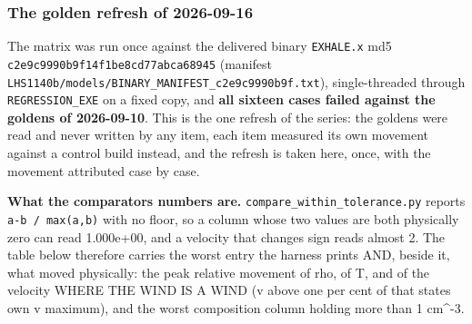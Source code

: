 \documentclass[english,a4paper]{my_memo}
\begin{document}
\subsubsection{The golden refresh of 2026-09-16}\label{the-golden-refresh-of-2026-09-16}

The matrix was run once against the delivered binary \texttt{EXHALE.x} md5
\texttt{c2e9c9990b9f14f1be8cd77abca68945} (manifest
\texttt{LHS1140b/models/BINARY\_MANIFEST\_c2e9c9990b9f.txt}), single-threaded through
\texttt{REGRESSION\_EXE} on a fixed copy, and \textbf{all sixteen cases failed against the
goldens of 2026-09-10}. This is the one refresh of the series: the goldens
were read and never written by any item, each item measured its own movement
against a control build instead, and the refresh is taken here, once, with the
movement attributed case by case.

\textbf{What the comparator\textquotesingle s numbers are.} \texttt{compare\_within\_tolerance.py} reports
\texttt{\textbar{}a-b\textbar{}\ /\ max(\textbar{}a\textbar{},\textbar{}b\textbar{})} with no floor, so a column whose two values are both
physically zero can read 1.000e+00, and a velocity that changes sign reads
almost 2. The table below therefore carries the worst entry the harness
prints AND, beside it, what moved physically: the peak relative movement of
rho, of T, and of the velocity WHERE THE WIND IS A WIND (\textbar v\textbar{} above one per
cent of that state\textquotesingle s own \textbar v\textbar{} maximum), and the worst composition column
holding more than 1 cm\^{}-3.
\end{document}
